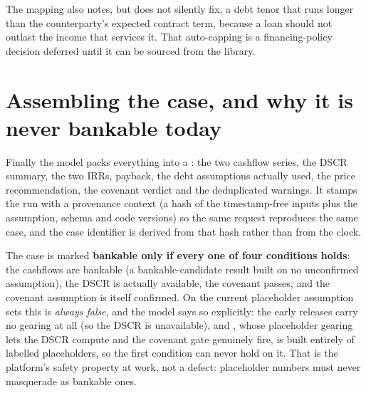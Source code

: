 The mapping also notes, but does not silently fix, a debt tenor that runs longer than the counterparty's expected contract term, because a loan should not outlast the income that services it. That auto-capping is a financing-policy decision deferred until it can be sourced from the library.

\section{Assembling the case, and why it is never bankable today}

Finally the model packs everything into a : the two cashflow series, the DSCR summary, the two IRRs, payback, the debt assumptions actually used, the price recommendation, the covenant verdict and the deduplicated warnings. It stamps the run with a provenance context (a hash of the timestamp-free inputs plus the assumption, schema and code versions) so the same request reproduces the same case, and the case identifier is derived from that hash rather than from the clock.

The case is marked \textbf{bankable only if every one of four conditions holds}: the cashflows are bankable (a bankable-candidate result built on no unconfirmed assumption), the DSCR is actually available, the covenant passes, and the covenant assumption is itself confirmed. On the current placeholder assumption sets this is \emph{always false}, and the model says so explicitly: the early releases carry no gearing at all (so the DSCR is unavailable), and , whose placeholder gearing lets the DSCR compute and the covenant gate genuinely fire, is built entirely of labelled placeholders, so the first condition can never hold on it. That is the platform's safety property at work, not a defect: placeholder numbers must never masquerade as bankable ones.

